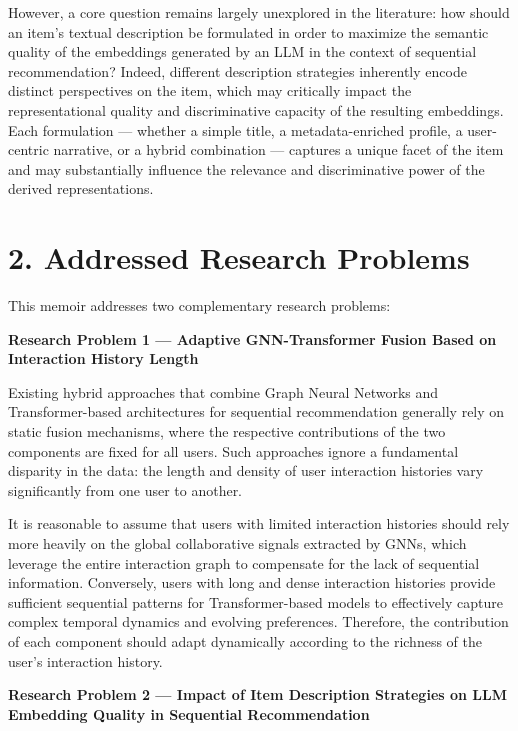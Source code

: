 \documentclass[12pt,a4paper]{report}
\begin{document}
However, a core question remains largely unexplored in the literature: how should
an item's textual description be formulated in order to maximize the semantic quality
of the embeddings generated by an LLM in the context of sequential recommendation?
Indeed, different description strategies inherently encode distinct perspectives on
the item, which may critically impact the representational quality and discriminative
capacity of the resulting embeddings. Each formulation --- whether a simple title, a
metadata-enriched profile, a user-centric narrative, or a hybrid combination ---
captures a unique facet of the item and may substantially influence the relevance
and discriminative power of the derived representations.


\section*{2. Addressed Research Problems}

This memoir addresses two complementary research problems:

\medskip
\noindent\textbf{Research Problem 1 --- Adaptive GNN-Transformer Fusion Based on
Interaction History Length}

\medskip
Existing hybrid approaches that combine Graph Neural Networks and Transformer-based
architectures for sequential recommendation generally rely on static fusion
mechanisms, where the respective contributions of the two components are fixed for
all users. Such approaches ignore a fundamental disparity in the data: the length
and density of user interaction histories vary significantly from one user to another.

It is reasonable to assume that users with limited interaction histories should rely
more heavily on the global collaborative signals extracted by GNNs, which leverage
the entire interaction graph to compensate for the lack of sequential information.
Conversely, users with long and dense interaction histories provide sufficient
sequential patterns for Transformer-based models to effectively capture complex
temporal dynamics and evolving preferences. Therefore, the contribution of each
component should adapt dynamically according to the richness of the user's
interaction history.

\medskip
\noindent\textbf{Research Problem 2 --- Impact of Item Description Strategies on
LLM Embedding Quality in Sequential Recommendation}
\end{document}
